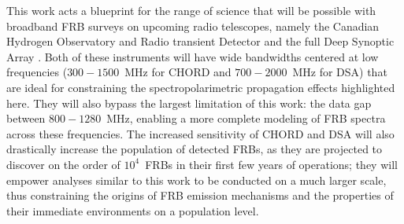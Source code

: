 \documentclass[twocolumn, linenumbers]{aastex701}
\begin{document}
This work acts a blueprint for the range of science that will be possible with broadband FRB surveys on upcoming radio telescopes, namely the Canadian Hydrogen Observatory and Radio transient Detector \citep[CHORD;][]{CHORD} and the full Deep Synoptic Array \citep[DSA;][]{DSA2000}. Both of these instruments will have wide bandwidths centered at low frequencies ($300-1500$~MHz for CHORD and $700-2000$~MHz for DSA) that are ideal for constraining the spectropolarimetric propagation effects highlighted here. They will also bypass the largest limitation of this work: the data gap between $800-1280$~MHz, enabling a more complete modeling of FRB spectra across these frequencies. The increased sensitivity of CHORD and DSA will also drastically increase the population of detected FRBs, as they are projected to discover on the order of $10^4$~FRBs in their first few years of operations; they will empower analyses similar to this work to be conducted on a much larger scale, thus constraining the origins of FRB emission mechanisms and the properties of their immediate environments on a population level.
\end{document}
